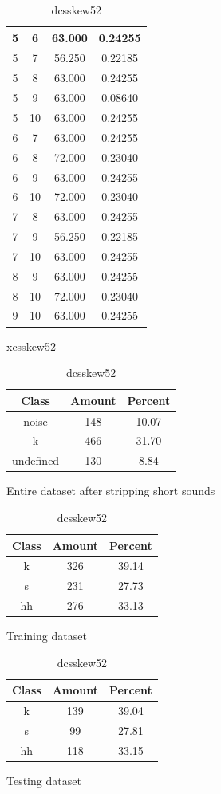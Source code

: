 \begin{table}
\begin{subtable}[tbp]{0.45\textwidth}
{\begin{tabular}{|c|c|c|c|}
 5 & 6 & 63.000 & 0.24255\\ \hline 
 5 & 7 & 56.250 & 0.22185\\ \hline 
 5 & 8 & 63.000 & 0.24255\\ \hline 
 5 & 9 & 63.000 & 0.08640\\ \hline 
 5 & 10 & 63.000 & 0.24255\\ \hline 
 6 & 7 & 63.000 & 0.24255\\ \hline 
 6 & 8 & 72.000 & 0.23040\\ \hline 
 6 & 9 & 63.000 & 0.24255\\ \hline 
 6 & 10 & 72.000 & 0.23040\\ \hline 
 7 & 8 & 63.000 & 0.24255\\ \hline 
 7 & 9 & 56.250 & 0.22185\\ \hline 
 7 & 10 & 63.000 & 0.24255\\ \hline 
 8 & 9 & 63.000 & 0.24255\\ \hline 
 8 & 10 & 72.000 & 0.23040\\ \hline 
 9 & 10 & 63.000 & 0.24255\\ \hline 

\end{tabular}
} \label{xlsskew52}
\caption{xcsskew52}
\end{subtable}

\begin{subtable}[tbp]{0.45\textwidth}
\centering
\begin{tabular}{|c|c|c|}
\hline
Class & Amount & Percent\\ \hline
noise & 148 & 10.07\\ \hline
k & 466 & 31.70\\ \hline
undefined & 130 & 8.84\\ \hline
\end{tabular}
\caption{Entire dataset after stripping short sounds}
\end{subtable}
\hfill
\begin{subtable}[tbp]{0.45\textwidth}
\centering
\begin{tabular}{|c|c|c|}
\hline
Class & Amount & Percent\\ \hline
k & 326 & 39.14\\ \hline
s & 231 & 27.73\\ \hline
hh & 276 & 33.13\\ \hline
\end{tabular}
\caption{Training dataset}
\end{subtable}
\hfill
\begin{subtable}[tbp]{0.45\textwidth}
\centering
\begin{tabular}{|c|c|c|}
\hline
Class & Amount & Percent\\ \hline
k & 139 & 39.04\\ \hline
s & 99 & 27.81\\ \hline
hh & 118 & 33.15\\ \hline
\end{tabular}
\caption{Testing dataset}
\end{subtable}
\hfill

\label{dlsskew52}

\caption{dcsskew52}

\end{table}\clearpage
